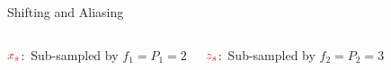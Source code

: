 \documentclass[10pt,xcolor=table]{beamer}
\begin{document}
	\begin{frame}{Shifting and Aliasing}
	
	\begin{block}{}
		\begin{figure}[t]
			\begin{center}
				\resizebox{1.0\textwidth}{!}{}
			\end{center}
		\end{figure}
	\end{block}
	
	\begin{columns}
		
		\begin{block}{{\small $\color{red}x_s$:\ Sub-sampled by $f_1=P_1=2$}}
				\begin{figure}[t]
				\begin{center}
					\resizebox{1.0\textwidth}{!}{}
				\end{center}
			\end{figure}
		\end{block}
		
		\begin{block}{{\small$\color{red}z_s$:\ Sub-sampled by $f_2=P_2=3$}}
				\begin{figure}[t]
				\begin{center}
					\resizebox{1.0\textwidth}{!}{}
				\end{center}
			\end{figure}
		\end{block}
		

\end{columns}
\end{frame}
\end{document}
